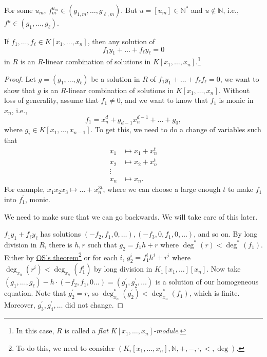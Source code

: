 \begin{note}
	For some \(u_m\), \(f_m^{u_m}\in (g_{1, m}, \dots , g_{\ell , m})\). But \(u = [u_m]\in \mathbb{N} ^{\ast} \) and \(u \notin \mathbb{N} \), i.e., \(f^u \in (g_1, \dots , g_{\ell })\).
\end{note}

\begin{theorem}\label{thm:lec26}
	If \(f_1, \dots , f_{\ell } \in K[x_1, \dots , x_n]\), then any solution of
	\[
		f_1 y_1 + \dots + f_{\ell } y_{\ell } = 0
	\]
	in \(R\) is an \(R\)-linear combination of solutions in \(K[x_1, \dots , x_n]\).\footnote{In this case, \(R\) is called a \emph{flat \(K[x_1, \dots , x_n]\)-module}.}
\end{theorem}
\begin{proof}
	Let \(g = (g_1, \dots , g_{\ell } )\) be a solution in \(R\) of \(f_1 y_1 + \dots + f_{\ell } f_{\ell } = 0 \), we want to show that \(g\) is an \(R\)-linear combination of solutions in \(K[x_1, \dots , x_n]\). Without loss of generality, assume that \(f_1 \neq 0\), and we want to know that \(f_1\) is monic in \(x_n\), i.e.,
	\[
		f_1 = x_n^d + g_{d-1} x_n^{d-1} + \dots + g_0,
	\]
	where \(g_i\in K[x_1, \dots , x_{n-1}]\). To get this, we need to do a change of variables such that
	\[
		\begin{split}
			x_1 &\mapsto x_1 + x_n^t \\
			x_2 &\mapsto x_2 + x_n^t \\
			\vdots& \\
			x_n &\mapsto x_n.
		\end{split}
	\]
	For example, \(x_1 x_2 x_3 \mapsto \dots + x_n^{3t}\), where we can choose a large enough \(t\) to make \(f_1\) into \(f_1^{\prime} \), monic.

	\begin{note}
		We need to make sure that we can go backwards. We will take care of this later.
	\end{note}

	\(f_1 y_1 + f_{\ell } y_{\ell }  \) has solutions \((-f_2, f_1, 0, \dots ), (-f_3, 0, f_1, 0, \dots )\), and so on. By long division in \(R\), there is \(h, r\) such that \(g_2 = f_1 h + r\) where \(\deg^{\ast} (r) < \deg ^{\ast} (f_1)\). Either by \hyperref[thm:Los]{OS's theorem}\footnote{To do this, we need to consider \((K_i[x_1, \dots , x_n], \mathbb{N} , +, -, \cdot, < , \deg)\).} or for each \(i\), \(g_2^i = f_1^i h^i + r^i\) where \(\deg_{x_n}(r^i) < \deg_{x_n}(f_1^i)\) by long division in \(K_1[x_1, \dots ][x_n]\). Now take \((g_1, \dots , g_{\ell }) - h\cdot (-f_2, f_1, 0 \dots ) = (g_1 ^{\prime} , g_2 ^{\prime} , \dots )\) is a solution of our homogeneous equation. Note that \(g_2^{\prime} = r\), so \(\deg^{\ast} _{x_n}(g_2^{\prime} ) < \deg^{\ast} _{x_n}(f_1)\), which is finite. Moreover, \(g_3^{\prime} , g_4^{\prime} , \dots \) did not change.


\end{proof}
